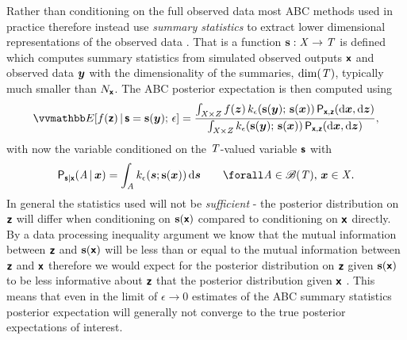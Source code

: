 Rather than conditioning on the full observed data most \ac{ABC} methods used in practice therefore instead use \emph{summary statistics} to extract lower dimensional representations of the observed data \citep{prangle2015summary}. That is a function ${\mathbf{s}} : \mathit{X} \to \mathit{T}$ is defined which computes summary statistics from simulated observed outputs $\boldsymbol{\mathsf{x}}$ and observed data $\boldsymbol{y}$ with the dimensionality of the summaries, $\dim({\mathit{T}})$, typically much smaller than $N_{\boldsymbol{\mathsf{x}}}$. The \ac{ABC} posterior expectation is then computed using
\begin{equation}
  \label{eq:abc-expectation-summary}
\begin{split}
  \expc{f(\rvct{z}) \gvn \rvct{s} = \vctfunc{s}(\vct{y});\,\epsilon} =
  \frac{
  \int_{\set{X}\times\set{Z}}
    f(\vct{z})\,k_{\epsilon}\lpa\vctfunc{s}(\vct{y});\,\vctfunc{s}(\vct{x})\rpa
  \,\prob{\rvct{x},\rvct{z}}(\dr\vct{x},\dr\vct{z})
  }
  {
  \int_{\set{X}\times\set{Z}}
    k_\epsilon\lpa\vctfunc{s}(\vct{y});\,\vctfunc{s}(\vct{x})\rpa\,
  \prob{\rvct{x},\rvct{z}}(\dr\vct{x},\dr\vct{z})
  },
\end{split}
\end{equation}
with now the variable conditioned on the $\mathit{T}$-valued variable $\boldsymbol{\mathsf{s}}$ with 
\begin{equation}\label{eq:abc-kernel-summary}
  \prob{\rvct{s}|\rvct{x}}\lpa \set{A} \gvn \vct{x} \rpa = 
  \int_{\set{A}} k_{\epsilon}(\vct{s}; \vctfunc{s}(\vct{x})) \,\dr\vct{s}
  \qquad \forall \set{A} \in \borel(\set{T}),\,\vct{x}\in\set{X}.
\end{equation}
In general the statistics used will not be \emph{sufficient} - the posterior distribution on $\boldsymbol{\mathsf{z}}$ will differ when conditioning on ${\mathbf{s}}(\boldsymbol{\mathsf{x}})$ compared to conditioning on $\boldsymbol{\mathsf{x}}$ directly. By a data processing inequality argument we know that the mutual information between $\boldsymbol{\mathsf{z}}$ and ${\mathbf{s}}(\boldsymbol{\mathsf{x}})$ will be less than or equal to the mutual information between $\boldsymbol{\mathsf{z}}$ and $\boldsymbol{\mathsf{x}}$ therefore we would expect for the posterior distribution on $\boldsymbol{\mathsf{z}}$ given ${\mathbf{s}}(\boldsymbol{\mathsf{x}})$ to be less informative about $\boldsymbol{\mathsf{z}}$ that the posterior distribution given $\boldsymbol{\mathsf{x}}$ \citep{barnes2012considerate}. This means that even in the limit of $\epsilon \to 0$ estimates of the \ac{ABC} summary statistics posterior expectation will generally not converge to the true posterior expectations of interest. 

